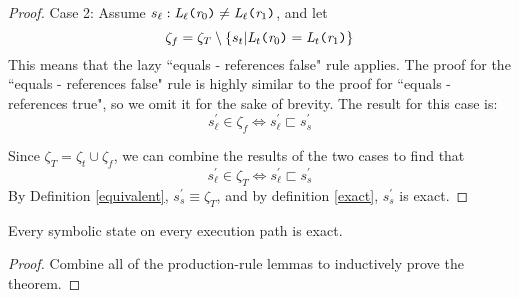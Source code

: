 \begin{proof}
Case 2: Assume $s_\ell : \emph{L}_\ell \texttt{(} \emph{r}_0\texttt{)} \neq \emph{L}_\ell \texttt{(} \emph{r}_1 \texttt{)}$, and let 
$$\zeta_f = \zeta_T \setminus \{ s_t | \emph{L}_t \texttt{(} \emph{r}_0\texttt{)} = \emph{L}_t \texttt{(} \emph{r}_1 \texttt{)} \}$$ 
This means that the lazy ``equals - references false" rule applies. The proof for the ``equals - references false" rule is highly similar to the proof for ``equals - references true", so we omit it for the sake of brevity. The result for this case is:
$$s_\ell^\prime \in \zeta_f \Leftrightarrow s_\ell^\prime \sqsubset s_s^\prime$$

Since $\zeta_T = \zeta_t \cup \zeta_f$, we can combine the results of the two cases to find that 
$$s_\ell^\prime \in \zeta_T \Leftrightarrow s_\ell^\prime \sqsubset s_s^\prime$$
 By Definition \ref{equivalent}, $s_s^\prime \equiv \zeta_T$, and by definition \ref{exact}, $s_s^\prime$ is exact.
\end{proof}

\begin{theorem}
Every symbolic state on every execution path is exact.
\end{theorem}
\begin{proof}
Combine all of the production-rule lemmas to inductively prove the theorem.
\end{proof}
